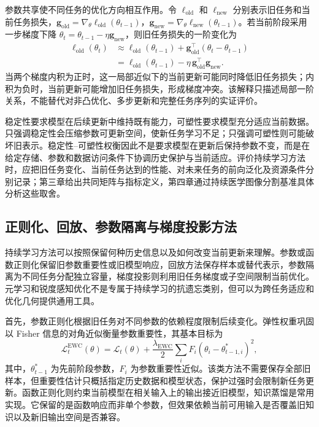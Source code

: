 参数共享使不同任务的优化方向相互作用。令 $\ell_{\mathrm{old}}$ 和 $\ell_{\mathrm{new}}$ 分别表示旧任务和当前任务损失，$\mathbf{g}_{\mathrm{old}}=\nabla_\theta\ell_{\mathrm{old}}(\theta_{t-1})$，$\mathbf{g}_{\mathrm{new}}=\nabla_\theta\ell_{\mathrm{new}}(\theta_{t-1})$。若当前阶段采用一步梯度下降 $\theta_t=\theta_{t-1}-\eta\mathbf{g}_{\mathrm{new}}$，则旧任务损失的一阶变化为
\begin{equation}
\begin{aligned}
\ell_{\mathrm{old}}(\theta_t)
&\approx
\ell_{\mathrm{old}}(\theta_{t-1})
+
\mathbf{g}_{\mathrm{old}}^{\top}
(\theta_t-\theta_{t-1})
\\
&=
\ell_{\mathrm{old}}(\theta_{t-1})
-
\eta\,
\mathbf{g}_{\mathrm{old}}^{\top}
\mathbf{g}_{\mathrm{new}} .
\end{aligned}
\label{eq:foundations-gradient-interference}
\end{equation}
当两个梯度内积为正时，这一局部近似下的当前更新可能同时降低旧任务损失；内积为负时，当前更新可能增加旧任务损失，形成梯度冲突\cite{method_replay_gem}。该解释只描述局部一阶关系，不能替代对非凸优化、多步更新和完整任务序列的实证评价。

稳定性要求模型在后续更新中维持既有能力，可塑性要求模型充分适应当前数据。只强调稳定性会压缩参数可更新空间，使新任务学习不足；只强调可塑性则可能破坏旧表示。稳定性--可塑性权衡因此不是要求模型在更新后保持参数不变，而是在给定存储、参数和数据访问条件下协调历史保护与当前适应\cite{hadsell2020embracing}。评价持续学习方法时，应把旧任务变化、当前任务达到的性能、对未来任务的前向泛化及资源条件分别记录；第三章给出共同矩阵与指标定义，第四章通过持续医学图像分割基准具体分析这些取舍。

\subsection{正则化、回放、参数隔离与梯度投影方法}
\label{subsec:foundations-cl-methods}

持续学习方法可以按照保留何种历史信息以及如何改变当前更新来理解。参数或函数正则化保留旧参数重要性或旧模型响应，回放方法保存样本或替代表示，参数隔离为不同任务分配独立容量，梯度投影则利用旧任务梯度或子空间限制当前优化。元学习和锐度感知优化不是专属于持续学习的抗遗忘类别，但可以为跨任务适应和优化几何提供通用工具。

首先，参数正则化根据旧任务对不同参数的依赖程度限制后续变化。弹性权重巩固以 Fisher 信息的对角近似衡量参数重要性，其基本目标为\cite{kirkpatrick2017ewc}
\begin{equation}
\mathcal{L}_{t}^{\mathrm{EWC}}(\theta)
=
\mathcal{L}_{t}(\theta)
+
\frac{\lambda_{\mathrm{EWC}}}{2}
\sum_i
F_i
\left(
\theta_i-\theta_{t-1,i}^{*}
\right)^2 ,
\label{eq:foundations-ewc}
\end{equation}
其中，$\theta_{t-1}^{*}$ 为先前阶段参数，$F_i$ 为参数重要性近似。该类方法不需要保存全部旧样本，但重要性估计只概括指定历史数据和模型状态，保护过强时会限制新任务更新。函数正则化则约束当前模型在相关输入上的输出接近旧模型，知识蒸馏是常用实现\cite{li2018lwf}。它保留的是函数响应而非单个参数，但效果依赖当前可用输入是否覆盖旧知识以及新旧输出空间是否兼容。

